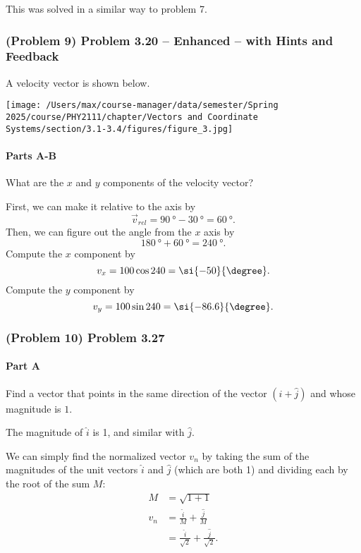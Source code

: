 \begin{solution}
	This was solved in a similar way to problem 7.
\end{solution}

\newpage

\subsubsection{(Problem 9) Problem 3.20 -- Enhanced -- with Hints and Feedback}

A velocity vector is shown below.

\begin{center}
	\texttt{[image: /Users/max/course-manager/data/semester/Spring 2025/course/PHY2111/chapter/Vectors and Coordinate Systems/section/3.1-3.4/figures/figure\_3.jpg]}
\end{center}

\setcounter{partcounter}{2}
\paragraph{Parts A-B}

What are the $x$ and $y$ components of the velocity vector?

\begin{solution}
	First, we can make it relative to the axis by
	\[
		\vec{v}_{rel} = \SI{90}{\degree} - \SI{30}{\degree} = \SI{60}{\degree}
		.\]
	Then, we can figure out the angle from the $x$ axis by
	\[
		\SI{180}{\degree} + \SI{60}{\degree} = \SI{240}{\degree}
		.\]
	Compute the $x$ component by
	\[
		v_{x} = 100 \cos 240 = \si{-50}{\degree}
		.\]
	Compute the $y$ component by
	\[
		v_{y} = 100 \sin 240 = \si{-86.6}{\degree}
		.\]
\end{solution}

\newpage

\subsubsection{(Problem 10) Problem 3.27}

\setcounter{partcounter}{1}
\paragraph{Part A}

Find a vector that points in the same direction of the vector $\left( \hat{i} + \hat{j} \right)$ and whose magnitude is $1$.

\begin{solution}
	The magnitude of $\hat{i}$ is 1, and similar with $\hat{j}$.

	We can simply find the normalized vector $v_{n}$ by taking the sum of the magnitudes of the unit vectors $\hat{i}$ and $\hat{j}$ (which are both 1) and dividing each by the root of the sum $M$:
	\begin{align*}
		M &= \sqrt{1 + 1} \\
		v_{n} &= \frac{\hat{i}}{M} + \frac{\hat{j}}{M} \\
		&= \frac{\hat{i}}{\sqrt{2}} + \frac{\hat{j}}{\sqrt{2}}
		.\end{align*}
\end{solution}

